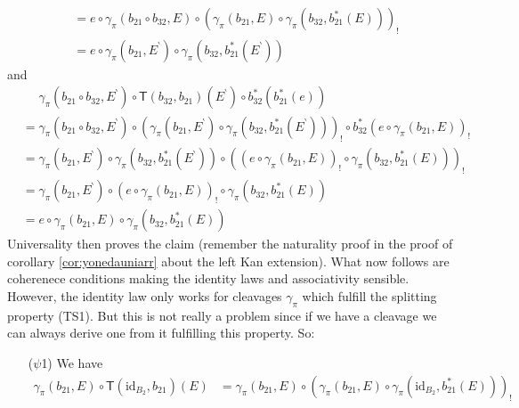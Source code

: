 \begin{enumerate}
\begin{align*}
  &=
  e
  \circ
  \gamma_{\pi}(b_{21} \circ b_{32},E)
  \circ
  \left(
    \gamma_{\pi}(b_{21},E)
    \circ
    \gamma_{\pi}(b_{32},b_{21}^{\ast}(E))
  \right)_{!}
  \\
  &=
  e
  \circ
  \gamma_{\pi}(b_{21},E^{\backprime})
  \circ
  \gamma_{\pi}(b_{32},b_{21}^{\ast}(E^{\backprime}))
\end{align*}
and
\begin{align*}
  &\phantom{=}
  \gamma_{\pi}(b_{21} \circ b_{32},E^{\backprime})
  \circ
  \mathsf{T}(b_{32},b_{21})
  \left(
    E^{\backprime}
  \right)
  \circ
  b_{32}^{\ast}
  \left(
    b_{21}^{\ast}(e)
  \right)
  \\
  &=
  \gamma_{\pi}(b_{21} \circ b_{32},E^{\backprime})
  \circ
  \left(
    \gamma_{\pi}(b_{21},E^{\backprime})
    \circ
    \gamma_{\pi}(b_{32},b_{21}^{\ast}(E^{\backprime}))
  \right)_{!}
  \circ
  b_{32}^{\ast}
  \left(
    e
    \circ
    \gamma_{\pi}(b_{21},E)
  \right)_{!}
  \\
  &=
  \gamma_{\pi}(b_{21},E^{\backprime})
  \circ
  \gamma_{\pi}(b_{32},b_{21}^{\ast}(E^{\backprime}))
  \circ
  \left(
    \left(
      e
      \circ
      \gamma_{\pi}(b_{21},E)
    \right)_{!}
    \circ
    \gamma_{\pi}(b_{32},b_{21}^{\ast}(E))
  \right)_{!}
  \\
  &=
  \gamma_{\pi}(b_{21},E^{\backprime})
  \circ
  \left(
    e
    \circ
    \gamma_{\pi}(b_{21},E)
  \right)_{!}
  \circ
  \gamma_{\pi}(b_{32},b_{21}^{\ast}(E))
  \\
  &=
  e
  \circ
  \gamma_{\pi}(b_{21},E)
  \circ
  \gamma_{\pi}(b_{32},b_{21}^{\ast}(E))
\end{align*}
Universality then proves the claim (remember the naturality proof in the proof of corollary \ref{cor:yonedauniarr} about the left Kan extension). What now follows are coherenece conditions making the identity laws and associativity sensible. However, the identity law only works for cleavages $\gamma_{\pi}$ which fulfill the splitting property (TS1). But this is not really a problem since if we have a cleavage we can always derive one from it fulfilling this property. So:
\begin{enumerate}
\item[($\psi$1)]
We have
\begin{align*}
  \gamma_{\pi}(b_{21},E)
  \circ
  \mathsf{T}(\mathrm{id}_{B_{2}},b_{21})(E)
  &=
  \gamma_{\pi}(b_{21},E)
  \circ
  \left(
    \gamma_{\pi}(b_{21},E)
    \circ
    \gamma_{\pi}(\mathrm{id}_{B_{2}},b_{21}^{\ast}(E))
  \right)_{!}
  \\

\end{align*}
\end{enumerate}
\end{enumerate}
